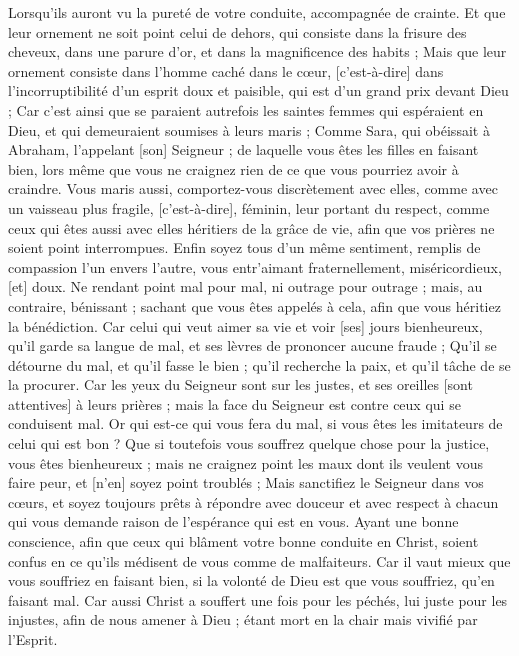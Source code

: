 \begin{multicols}{2}
Lorsqu'ils auront vu la pureté de votre conduite, accompagnée de crainte.
Et que leur ornement ne soit point celui de dehors, qui consiste dans la frisure des cheveux, dans une parure d'or, et dans la magnificence des habits ;
Mais que leur ornement consiste dans l'homme caché dans le cœur, [c'est-à-dire] dans l'incorruptibilité d'un esprit doux et paisible, qui est d'un grand prix devant Dieu ;
Car c'est ainsi que se paraient autrefois les saintes femmes qui espéraient en Dieu, et qui demeuraient soumises à leurs maris ;
Comme Sara, qui obéissait à Abraham, l'appelant [son] Seigneur ; de laquelle vous êtes les filles en faisant bien, lors même que vous ne craignez rien de ce que vous pourriez avoir à craindre.
Vous maris aussi, comportez-vous discrètement avec elles, comme avec un vaisseau plus fragile, [c'est-à-dire], féminin, leur portant du respect, comme ceux qui êtes aussi avec elles héritiers de la grâce de vie, afin que vos prières ne soient point interrompues.
Enfin soyez tous d'un même sentiment, remplis de compassion l'un envers l'autre, vous entr'aimant fraternellement, miséricordieux, [et] doux.
Ne rendant point mal pour mal, ni outrage pour outrage ; mais, au contraire, bénissant ; sachant que vous êtes appelés à cela, afin que vous héritiez la bénédiction.
Car celui qui veut aimer sa vie et voir [ses] jours bienheureux, qu'il garde sa langue de mal, et ses lèvres de prononcer aucune fraude ;
Qu'il se détourne du mal, et qu'il fasse le bien ; qu'il recherche la paix, et qu'il tâche de se la procurer.
Car les yeux du Seigneur sont sur les justes, et ses oreilles [sont attentives] à leurs prières ; mais la face du Seigneur est contre ceux qui se conduisent mal.
Or qui est-ce qui vous fera du mal, si vous êtes les imitateurs de celui qui est bon ?
Que si toutefois vous souffrez quelque chose pour la justice, vous êtes bienheureux ; mais ne craignez point les maux dont ils veulent vous faire peur, et [n'en] soyez point troublés ;
Mais sanctifiez le Seigneur dans vos cœurs, et soyez toujours prêts à répondre avec douceur et avec respect à chacun qui vous demande raison de l'espérance qui est en vous.
Ayant une bonne conscience, afin que ceux qui blâment votre bonne conduite en Christ, soient confus en ce qu'ils médisent de vous comme de malfaiteurs.
Car il vaut mieux que vous souffriez en faisant bien, si la volonté de Dieu est que vous souffriez, qu'en faisant mal.
Car aussi Christ a souffert une fois pour les péchés, lui juste pour les injustes, afin de nous amener à Dieu ; étant mort en la chair mais vivifié par l'Esprit.

\end{multicols}
